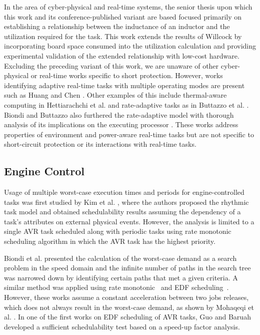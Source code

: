 In the area of cyber-physical and real-time systems, the senior thesis \cite{willcock_short_2016} upon which this work and its conference-published variant \cite{willcock_trading_2017-1} are based focused primarily on establishing a relationship between the inductance of an inductor and the utilization required for the task.
This work extends the results of Willcock \cite{willcock_short_2016} by incorporating board space consumed into the utilization calculation and providing experimental validation of the extended relationship with low-cost hardware.
Excluding the preceding variant of this work, we are unaware of other cyber-physical or real-time works specific to short protection.
However, works identifying adaptive real-time tasks with multiple operating modes are present such as Huang and Chen \cite{huang_techniques_2015}.
Other examples of this include thermal-aware computing in Hettiarachchi et al. \cite{hettiarachchi_design_2014} and rate-adaptive tasks as in Buttazzo et al. \cite{buttazzo_rate-adaptive_2014}.
Biondi and Buttazzo also furthered the rate-adaptive model with thorough analysis of its implications on the executing processor \cite{biondi_engine_2015}.
These works address properties of environment and power-aware real-time tasks but are not specific to short-circuit protection or its interactions with real-time tasks.

\subsection{Engine Control} \label{subsec:engCtrl-relatedWork}

Usage of multiple worst-case execution times and periods for engine-controlled tasks was first studied by Kim et al. \cite{kim_rhythmic_2012}, where the authors proposed the rhythmic task model and obtained schedulability results assuming the dependency of a task's attributes on external physical events.
However, the analysis is limited to a single AVR task scheduled along with periodic tasks using rate monotonic scheduling algorithm in which the AVR task has the highest priority.

Biondi et al. \cite{biondi_exact_2014} presented the calculation of the worst-case demand as a search problem in the speed domain and the infinite number of paths in the search tree was narrowed down by identifying certain paths that met a given criteria.
A similar method was applied using rate monotonic~\cite{biondi_response-time_2015} and EDF scheduling~\cite{biondi_feasibility_2015}.
However, these works assume a constant acceleration between two jobs releases, which does not always result in the worst-case demand, as shown by Mohaqeqi et al. \cite{mohaqeqi_refinement_2017}.
In one of the first works on EDF scheduling of AVR tasks, Guo and Baruah~\cite{guo_uniprocessor_2015} developed a sufficient schedulability test based on a speed-up factor analysis. %

